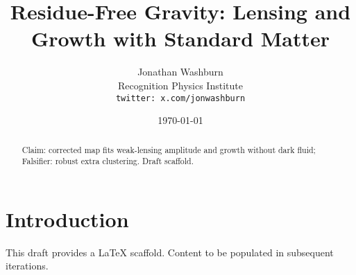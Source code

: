 \documentclass[11pt,letterpaper]{article}
\title{Residue-Free Gravity: Lensing and Growth with Standard Matter}
\author{Jonathan Washburn\\Recognition Physics Institute\\\texttt{twitter: x.com/jonwashburn}}
\date{\today}
\begin{document}
\maketitle
\begin{abstract}
Claim: corrected map fits weak-lensing amplitude and growth without dark fluid; Falsifier: robust extra clustering. Draft scaffold.
\end{abstract}
\section{Introduction}
This draft provides a LaTeX scaffold. Content to be populated in subsequent iterations.
\end{document}
